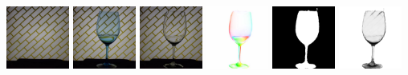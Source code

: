     \makebox[0.02\textwidth]{\footnotesize } 
    \\ 
    \includegraphics[width=0.155\textwidth]{ch-tomnet/images/Limitation/8_colored_030_ref.jpg}
    \includegraphics[width=0.155\textwidth]{ch-tomnet/images/Limitation/8_colored_030_tar.jpg}
    \includegraphics[width=0.155\textwidth]{ch-tomnet/images/Limitation/8_colored_030_pred.jpg}
    \includegraphics[width=0.155\textwidth]{ch-tomnet/images/Limitation/8_colored_030_fcolor.jpg}
    \includegraphics[width=0.155\textwidth]{ch-tomnet/images/Limitation/8_colored_030_mask.png}
    \includegraphics[width=0.155\textwidth]{ch-tomnet/images/Limitation/8_colored_030_rho.png}

